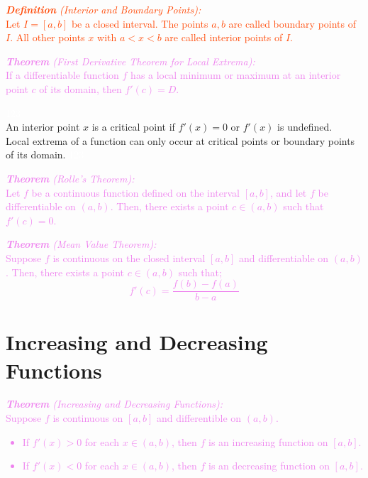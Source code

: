 \documentclass{report}
\newenvironment{definition}[1][OrangeRed]
  {\begin{tcolorbox}[colframe=#1,colback=white]}
  {\end{tcolorbox}}
\newenvironment{theorem}[1][Violet]
  {\begin{tcolorbox}[colframe=#1,colback=white]}
  {\end{tcolorbox}}
\begin{document}
\begin{definition}
    \textcolor{OrangeRed}{\textit{\textbf{Definition} (Interior and Boundary Points):}\\
    Let $I = [a,b]$ be a closed interval. The points $a,b$ are called boundary points of $I$. All other points $x$ with $a < x < b$ are called interior points of $I$.}
\end{definition}

\begin{theorem}
    \textcolor{Violet}{\textit{\textbf{Theorem} (First Derivative Theorem for Local Extrema):}\\
    If a differentiable function $f$ has a local minimum or maximum at an interior point $c$ of its domain, then $f'(c) = D$.}
\end{theorem}

\textcolor{White}{123}\\
An interior point $x$ is a critical point if $f'(x) = 0$ or $f'(x)$ is undefined.\\
Local extrema of a function can only occur at critical points or boundary points of its domain.
\textcolor{White}{123}\\

\begin{theorem}
    \textcolor{Violet}{\textit{\textbf{Theorem} (Rolle's Theorem):}\\
    Let $f$ be a continuous function defined on the interval $[a,b]$, and let $f$ be differentiable on $(a,b)$. Then, there exists a point $c \in (a,b)$ such that $f'(c) = 0$.}
\end{theorem}

\begin{theorem}
    \textcolor{Violet}{\textit{\textbf{Theorem} (Mean Value Theorem):}\\
    Suppose $f$ is continuous on the closed interval $[a,b]$ and differentiable on $(a,b)$. Then, there exists a point $c \in (a,b)$ such that;
    \begin{equation}
        f'(c) = \frac{f(b)-f(a)}{b-a}
    \end{equation}}
\end{theorem}

\section{Increasing and Decreasing Functions}

\begin{theorem}
    \textcolor{Violet}{\textit{\textbf{Theorem} (Increasing and Decreasing Functions):}\\
    Suppose $f$ is continuous on $[a,b]$ and differentible on $(a,b)$.\\
    \begin{itemize}
        \item If $f'(x) > 0$ for each $x \in (a,b)$, then $f$ is an increasing function on $[a,b]$.
        \item If $f'(x) < 0$ for each $x \in (a,b)$, then $f$ is an decreasing function on $[a,b]$.
    \end{itemize}}
\end{theorem}
\end{document}
